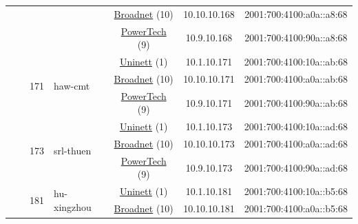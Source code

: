 \begin{small}
\begin{center}
\begin{longtable}{|c|c|c|c|c|c|c|c|}
  &  &  &  & \multicolumn{2}{|c|}{\tiny{\href{https://www.broadnet.no}{Broadnet} (10)}} & \tiny{10.10.10.168} & \tiny{2001:700:4100:a0a::a8:68} \\* \cline{5-5}\cline{6-6}\cline{7-7}\cline{8-8}
  &  &  &  & \multicolumn{2}{|c|}{\tiny{\href{http://www.powertech.no}{PowerTech} (9)}} & \tiny{10.9.10.168} & \tiny{2001:700:4100:90a::a8:68} \\* \cline{3-3}\cline{4-4}\cline{5-5}\cline{6-6}\cline{7-7}\cline{8-8}
  &  & \multirow{3}{*}{\tiny{171}} & \multicolumn{1}{|l|}{\multirow{3}{*}{\tiny{haw-cmt}}} & \multicolumn{2}{|c|}{\tiny{\href{https://www.uninett.no}{Uninett} (1)}} & \tiny{10.1.10.171} & \tiny{2001:700:4100:10a::ab:68} \\* \cline{5-5}\cline{6-6}\cline{7-7}\cline{8-8}
  &  &  &  & \multicolumn{2}{|c|}{\tiny{\href{https://www.broadnet.no}{Broadnet} (10)}} & \tiny{10.10.10.171} & \tiny{2001:700:4100:a0a::ab:68} \\* \cline{5-5}\cline{6-6}\cline{7-7}\cline{8-8}
  &  &  &  & \multicolumn{2}{|c|}{\tiny{\href{http://www.powertech.no}{PowerTech} (9)}} & \tiny{10.9.10.171} & \tiny{2001:700:4100:90a::ab:68} \\* \cline{3-3}\cline{4-4}\cline{5-5}\cline{6-6}\cline{7-7}\cline{8-8}
  &  & \multirow{3}{*}{\tiny{173}} & \multicolumn{1}{|l|}{\multirow{3}{*}{\tiny{srl-thuen}}} & \multicolumn{2}{|c|}{\tiny{\href{https://www.uninett.no}{Uninett} (1)}} & \tiny{10.1.10.173} & \tiny{2001:700:4100:10a::ad:68} \\* \cline{5-5}\cline{6-6}\cline{7-7}\cline{8-8}
  &  &  &  & \multicolumn{2}{|c|}{\tiny{\href{https://www.broadnet.no}{Broadnet} (10)}} & \tiny{10.10.10.173} & \tiny{2001:700:4100:a0a::ad:68} \\* \cline{5-5}\cline{6-6}\cline{7-7}\cline{8-8}
  &  &  &  & \multicolumn{2}{|c|}{\tiny{\href{http://www.powertech.no}{PowerTech} (9)}} & \tiny{10.9.10.173} & \tiny{2001:700:4100:90a::ad:68} \\* \cline{3-3}\cline{4-4}\cline{5-5}\cline{6-6}\cline{7-7}\cline{8-8}
  &  & \multirow{3}{*}{\tiny{181}} & \multicolumn{1}{|l|}{\multirow{3}{*}{\tiny{hu-xingzhou}}} & \multicolumn{2}{|c|}{\tiny{\href{https://www.uninett.no}{Uninett} (1)}} & \tiny{10.1.10.181} & \tiny{2001:700:4100:10a::b5:68} \\* \cline{5-5}\cline{6-6}\cline{7-7}\cline{8-8}
  &  &  &  & \multicolumn{2}{|c|}{\tiny{\href{https://www.broadnet.no}{Broadnet} (10)}} & \tiny{10.10.10.181} & \tiny{2001:700:4100:a0a::b5:68} \\* \cline{5-5}\cline{6-6}\cline{7-7}\cline{8-8}

\end{longtable}
\end{center}
\end{small}
